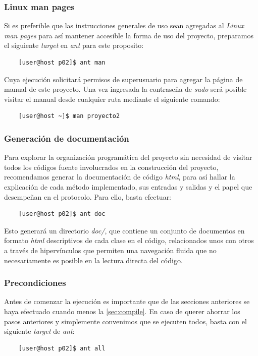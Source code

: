 \documentclass[12pt]{article}
\begin{document}
\subsubsection{Linux man pages}\label{sec:man}
Si es preferible que las instrucciones generales de uso sean agregadas al \textit{Linux man pages} para así
mantener accesible la forma de uso del proyecto, preparamos el siguiente \textit{target} en \textit{ant} para este proposito:\\
\begin{verbatim}
    [user@host p02]$ ant man
\end{verbatim}
Cuya ejecución solicitará permisos de superusuario para agregar la página de manual de este proyecto. Una vez ingresada la contraseña de \textit{sudo} será posible visitar el manual desde cualquier ruta mediante el siguiente comando:
\begin{verbatim}
    [user@host ~]$ man proyecto2
\end{verbatim}

\subsubsection{Generación de documentación}\label{sec:doc}
Para explorar la organización programática del proyecto sin necesidad de visitar todos los códigos fuente involucrados en la construcción del proyecto, recomendamos generar la documentación de código \textit{html}, para así hallar la explicación de cada método implementado, sus entradas y salidas y el papel que desempeñan en el protocolo. Para ello, basta efectuar:
\begin{verbatim}
    [user@host p02]$ ant doc
\end{verbatim}
Esto generará un directorio \textit{doc/}, que contiene un conjunto de documentos en formato \textit{html} descriptivos de cada clase en el código, relacionados unos con otros a través de hipervínculos que permiten una navegación fluida que no necesariamente es posible en la lectura directa del código.
\subsubsection{Precondiciones}
Antes de comenzar la ejecución es importante que de las secciones anteriores se haya efectuado cuando menos la \ref{sec:compile}. En caso de querer ahorrar los pasos anteriores y simplemente convenimos que se ejecuten todos, basta con el siguiente \textit{target} de \textit{ant}:
\begin{verbatim}
    [user@host p02]$ ant all
\end{verbatim}
\end{document}
